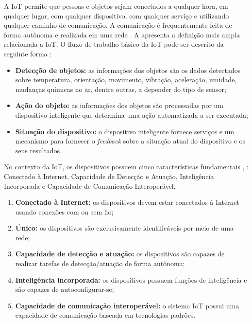 
A \acrshort{IoT} permite que pessoas e objetos sejam conectados a qualquer hora, em qualquer lugar, com qualquer dispositivo, com qualquer serviço e utilizando qualquer caminho de comunicação. A comunicação é frequentemente feita de forma autônoma e realizada em uma rede \cite{Perera2014}. A  apresenta a definição mais ampla relacionada a \acrshort{IoT}. O fluxo de trabalho básico da \acrshort{IoT} pode ser descrito da seguinte forma \cite{Khan2012}: 

\begin{itemize}
    \item \textbf{Detecção de objetos:} as informações dos objetos são os dados detectados sobre temperatura, orientação, movimento, vibração, aceleração, umidade, mudanças químicas no ar, dentre outras, a depender do tipo de sensor;
    \item \textbf{Ação do objeto:} as informações dos objetos são processadas por um dispositivo inteligente que determina uma ação automatizada a ser executada;
    \item \textbf{Situação do dispositivo:} o dispositivo inteligente fornece serviços e um mecanismo para fornecer o \textit{feedback} sobre a situação atual do dispositivo e os seus resultados.
\end{itemize}

No contexto da \acrshort{IoT}, os dispositivos possuem cinco características fundamentais \cite{Vashi2017InternetIssues}, \cite{Yousaf2017InternetObservation}: Conectado à Internet, Capacidade de Detecção e Atuação, Inteligência Incorporada e Capacidade de Comunicação Interoperável.

\begin{enumerate}
    \item \textbf{Conectado à Internet:} os dispositivos devem estar conectados à Internet usando conexões com ou sem fio;
    \item \textbf{Único:} os dispositivos são exclusivamente identificáveis por meio de uma rede;
    \item \textbf{Capacidade de detecção e atuação:} os dispositivos são capazes de realizar tarefas de detecção/atuação de forma autônoma;
    \item \textbf{Inteligência incorporada:} os dispositivos possuem funções de inteligência e são capazes de autoconfigurar-se;
    \item \textbf{Capacidade de comunicação interoperável:} o sistema \acrshort{IoT} possui uma capacidade de comunicação baseada em tecnologias padrões.
\end{enumerate}

